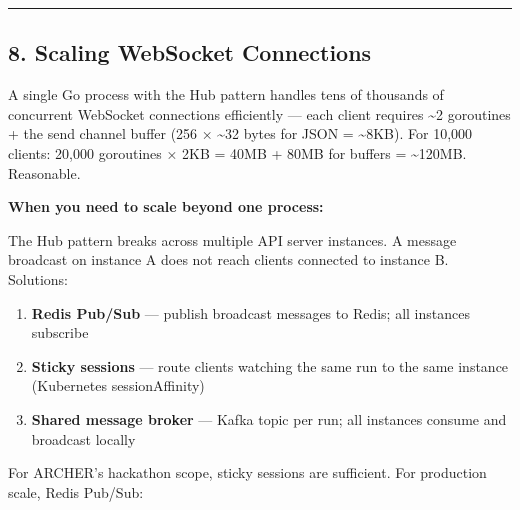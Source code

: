 \documentclass[
]{article}
\providecommand{\tightlist}{%
  \setlength{\itemsep}{0pt}\setlength{\parskip}{0pt}}
\begin{document}
\begin{center}\rule{0.5\linewidth}{0.5pt}\end{center}

\hypertarget{scaling-websocket-connections}{%
\subsection{8. Scaling WebSocket
Connections}\label{scaling-websocket-connections}}

A single Go process with the Hub pattern handles tens of thousands of
concurrent WebSocket connections efficiently --- each client requires
\textasciitilde2 goroutines + the send channel buffer (256 ×
\textasciitilde32 bytes for JSON = \textasciitilde8KB). For 10,000
clients: 20,000 goroutines × 2KB = 40MB + 80MB for buffers =
\textasciitilde120MB. Reasonable.

\textbf{When you need to scale beyond one process:}

The Hub pattern breaks across multiple API server instances. A message
broadcast on instance A does not reach clients connected to instance B.
Solutions:

\begin{enumerate}
\def\labelenumi{\arabic{enumi}.}
\tightlist
\item
  \textbf{Redis Pub/Sub} --- publish broadcast messages to Redis; all
  instances subscribe
\item
  \textbf{Sticky sessions} --- route clients watching the same run to
  the same instance (Kubernetes sessionAffinity)
\item
  \textbf{Shared message broker} --- Kafka topic per run; all instances
  consume and broadcast locally
\end{enumerate}

For ARCHER's hackathon scope, sticky sessions are sufficient. For
production scale, Redis Pub/Sub:
\end{document}
